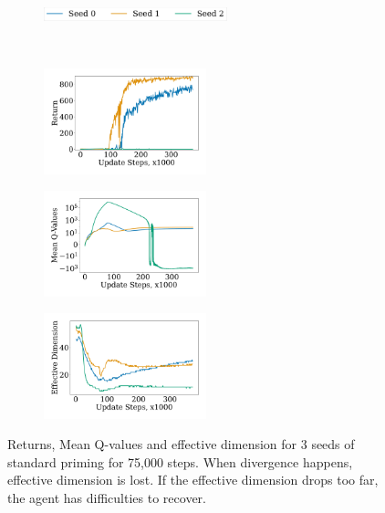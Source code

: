 \begin{figure}[H]
\centering
    \begin{subfigure}[b]{0.8\textwidth}
        \centering
        \includegraphics[height=0.4cm]{figures/dissecting/priming/elu_dim_return_legend.pdf}
    \end{subfigure}\\%
    \begin{subfigure}[b]{0.33\textwidth}
        \centering
        \includegraphics[width=4.7cm, trim=1cm 1cm 1cm 1cm ,clip]{figures/dissecting/priming/elu_dim_return.pdf}
        \label{subfig:elu_dim_ret}
    \end{subfigure}%
    \begin{subfigure}[b]{0.33\textwidth}
    \centering
        \includegraphics[width=4.7cm, trim=1cm 1cm 1cm 1cm ,clip]{figures/dissecting/priming/elu_dim_Q.pdf}
        \label{subfig:priming_dim_Q}
    \end{subfigure}%
    \begin{subfigure}[b]{0.33\textwidth}
        \centering
        \includegraphics[width=4.7cm, trim=1cm 1cm 1cm 1cm ,clip]{figures/dissecting/priming/elu_dim_ed.pdf}
        \label{subfig:overestimation:elu_priming_dim_ed}
    \end{subfigure}%
    \vspace{-5pt}
    \caption{Returns, Mean Q-values and effective dimension for $3$ seeds of standard priming for 75,000 steps. When divergence happens, effective dimension is lost. If the effective dimension drops too far, the agent has difficulties to recover.}
    \label{fig:overestimation:elu_priming_dim}
\end{figure}




